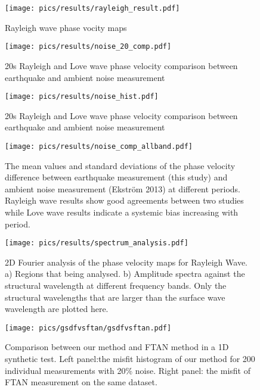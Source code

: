 \documentclass[referee]{gji}
\begin{document}

\begin{figure}
	\texttt{[image: pics/results/rayleigh\_result.pdf]}
	\caption{Rayleigh wave phase vocity maps}
	\label{fig:rayleigh_result}
\end{figure}


\begin{figure}
	\texttt{[image: pics/results/noise\_20\_comp.pdf]}
	\caption{20s Rayleigh and Love wave phase velocity comparison between earthquake and ambient noise measurement}
	\label{fig:noise_comp}
\end{figure}

\begin{figure}
	\texttt{[image: pics/results/noise\_hist.pdf]}
	\caption{20s Rayleigh and Love wave phase velocity comparison between earthquake and ambient noise measurement}
	\label{fig:noise_hist}
\end{figure}

\begin{figure}
	\texttt{[image: pics/results/noise\_comp\_allband.pdf]}
	\caption{The mean values and standard deviations of the phase velocity difference between earthquake measurement (this study) and ambient noise measurement (Ekstr\"{o}m 2013) at different periods. Rayleigh wave results show good agreements between two studies while Love wave results indicate a systemic bias increasing with period.  }
	\label{fig:noise_comp_allband}
\end{figure}

\begin{figure}
	\texttt{[image: pics/results/spectrum\_analysis.pdf]}
	\caption{2D Fourier analysis of the phase velocity maps for Rayleigh Wave. a) Regions that being analysed. b) Amplitude spectra against the structural wavelength at different frequency bands. Only the structural wavelengths that are larger than the surface wave wavelength are plotted here. }
	\label{fig:spectrum_analysis}
\end{figure}

\begin{figure}
	\texttt{[image: pics/gsdfvsftan/gsdfvsftan.pdf]}
	\caption{Comparison between our method and FTAN method in a 1D synthetic test. Left panel:the misfit histogram of our method for 200 individual measurements with 20\% noise. Right panel: the misfit of FTAN measurement on the same dataset.}
	\label{fig:syntest}
\end{figure}
\end{document}
